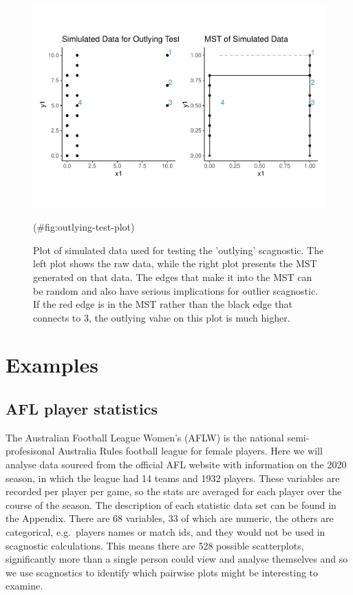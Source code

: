 \begin{Schunk}
\begin{figure}
\includegraphics[width=0.8\linewidth]{mason-lee-laa-cook_files/figure-latex/outlying-test-plot-1} \caption[Plot of simulated data used for testing the 'outlying' scagnostic]{Plot of simulated data used for testing the 'outlying' scagnostic. The left plot shows the raw data, while the right plot presents the MST generated on that data. The edges that make it into the MST can be random and also have serious implications for outlier scagnostic. If the red edge is in the MST rather than the black edge that connects to 3, the outlying value on this plot is much higher.}(\#fig:outlying-test-plot)
\end{figure}
\end{Schunk}

\hypertarget{examples}{%
\section{Examples}\label{examples}}

\hypertarget{afl-player-statistics}{%
\subsection{AFL player statistics}\label{afl-player-statistics}}

The Australian Football League Women's (AFLW) is the national
semi-profesisonal Australia Rules football league for female players.
Here we will analyse data sourced from the official AFL website with
information on the 2020 season, in which the league had 14 teams and
1932 players. These variables are recorded per player per game, so the
stats are averaged for each player over the course of the season. The
description of each statistic data set can be found in the Appendix.
There are 68 variables, 33 of which are numeric, the others are
categorical, e.g.~players names or match ids, and they would not be used
in scagnostic calculations. This means there are 528 possible
scatterplots, significantly more than a single person could view and
analyse themselves and so we use scagnostics to identify which pairwise
plots might be interesting to examine.

